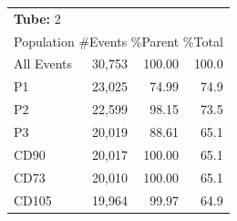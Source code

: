 \documentclass[UTF8,10pt,a4paper,fontset=fandol]{ctexart}
\newcommand{\fieldvalue}[1]{#1}
\begin{document}
\noindent
\begin{tabularx}{0.62\textwidth}{@{}lrrr@{}}
\multicolumn{4}{l}{\textbf{Tube:}
\fieldvalue{2}}\\
\multicolumn{4}{l}{Population \hfill \#Events \hfill \%Parent \hfill \%Total}\\
All Events &
\fieldvalue{30,753} &
\fieldvalue{100.00} &
\fieldvalue{100.0}\\
P1 &
\fieldvalue{23,025} &
\fieldvalue{74.99} &
\fieldvalue{74.9}\\
P2 &
\fieldvalue{22,599} &
\fieldvalue{98.15} &
\fieldvalue{73.5}\\
P3 &
\fieldvalue{20,019} &
\fieldvalue{88.61} &
\fieldvalue{65.1}\\
CD90 &
\fieldvalue{20,017} &
\fieldvalue{100.00} &
\fieldvalue{65.1}\\
CD73 &
\fieldvalue{20,010} &
\fieldvalue{100.00} &
\fieldvalue{65.1}\\
CD105 &
\fieldvalue{19,964} &
\fieldvalue{99.97} &
\fieldvalue{64.9}
\end{tabularx}

\vspace{1em}
\end{document}
